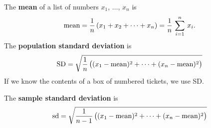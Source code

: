 \documentclass[10pt]{article}
\begin{document}
The \textbf{mean} of a list of numbers $x_1$, $\dots$, $x_n$ is\vspace{-4pt}
\[\mbox{mean} = \frac{1}{n}\,(x_1 + x_2 + \cdots + x_n) = \frac{1}{n}\,\sum_{i=1}^n\,x_i.\vspace{-4pt}\]
The \textbf{population standard deviation} is\vspace{-4pt}
\[\mbox{SD} = \sqrt{\frac{1}{n}\,\big((x_1-\mbox{mean})^2 + \cdots + (x_n - \mbox{mean})^2\big)}\vspace{-4pt}\]
If we know the contents of a box of numbered tickets, we use SD.

The \textbf{sample standard deviation} is\vspace{-4pt}
\[\mbox{sd} = \sqrt{\frac{1}{n-1}\,\big((x_1-\mbox{mean})^2 + \cdots + (x_n - \mbox{mean})^2\big)}\vspace{-4pt}\]
\end{document}

